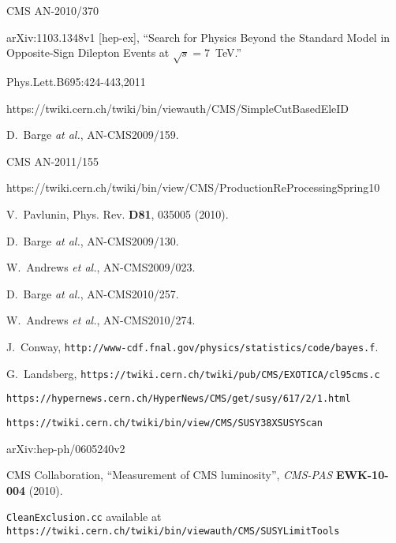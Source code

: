 \begin{thebibliography}{10}


 CMS AN-2010/370

 arXiv:1103.1348v1 [hep-ex], ``Search for Physics Beyond the Standard Model in Opposite-Sign Dilepton Events at $\sqrt{s} = 7$~TeV.''

 Phys.Lett.B695:424-443,2011 

 https://twiki.cern.ch/twiki/bin/viewauth/CMS/SimpleCutBasedEleID

 D.~Barge {\em at al.}, AN-CMS2009/159.

 CMS AN-2011/155

 https://twiki.cern.ch/twiki/bin/view/CMS/ProductionReProcessingSpring10 

V.~Pavlunin, Phys. Rev. {\bf D81}, 035005 (2010).

  D.~Barge {\em at al.}, AN-CMS2009/130.

 W.~Andrews {\em et al.}, AN-CMS2009/023.

 D.~Barge {\em at al.}, AN-CMS2010/257.

W.~Andrews {\em et al.}, AN-CMS2010/274.

 J.~Conway, {\tt http://www-cdf.fnal.gov/physics/statistics/code/bayes.f}.

 G.~Landsberg, {\tt https://twiki.cern.ch/twiki/pub/CMS/EXOTICA/cl95cms.c}

 {\tt https://hypernews.cern.ch/HyperNews/CMS/get/susy/617/2/1.html}

 {\tt https://twiki.cern.ch/twiki/bin/view/CMS/SUSY38XSUSYScan}

 arXiv:hep-ph/0605240v2

{CMS Collaboration}, ``Measurement of CMS luminosity'', {\em CMS-PAS} {\bf
  EWK-10-004} (2010).

 {\tt CleanExclusion.cc} available at
{\tt https://twiki.cern.ch/twiki/bin/viewauth/CMS/SUSYLimitTools}


\end{thebibliography}
